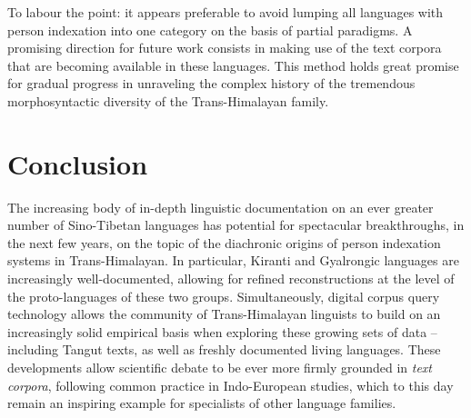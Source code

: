 \documentclass[oldfontcommands,oneside,a4paper,11pt]{article}
\begin{document}
To labour the point: it appears preferable to avoid lumping all languages with person indexation into one category on the basis of partial paradigms. A promising direction for future work consists in making use of the text corpora that are becoming available in these languages. This method holds great promise for gradual progress in unraveling the complex history of the tremendous morphosyntactic diversity of the Trans-Himalayan family.

\section{Conclusion}

The increasing body of in-depth linguistic documentation on an ever greater number of Sino-Tibetan languages has potential for spectacular breakthroughs, in the next few years, on the topic of the diachronic origins of person indexation systems in Trans-Himalayan. In particular, Kiranti and Gyalrongic languages are increasingly well-documented, allowing for refined reconstructions at the level of the proto-languages of these two groups. Simultaneously, digital corpus query technology allows the community of Trans-Himalayan linguists to build on an increasingly solid empirical basis when exploring these growing sets of data -- including Tangut texts, as well as freshly documented living languages. These developments allow scientific debate to be ever more firmly grounded in \textit{text corpora}, following common practice in Indo-European studies, which to this day remain an inspiring example for specialists of other language families.

\charis


\end{document}
